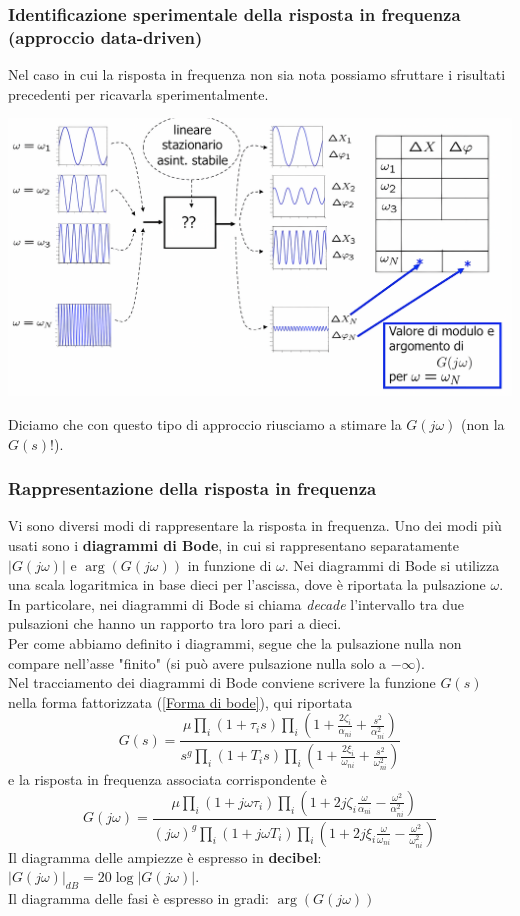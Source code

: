 \documentclass{article}
\numberwithin{equation}{subsection}
\begin{document}
\subsubsection{Identificazione sperimentale della risposta in frequenza (approccio data-driven)}
Nel caso in cui la risposta in frequenza non sia nota possiamo sfruttare i risultati precedenti per ricavarla sperimentalmente.
\begin{center}
    \includegraphics[scale=0.15]{Images/Risposta_in_frequenza_2.png}
\end{center}
Diciamo che con questo tipo di approccio riusciamo a stimare la $G(j\omega)$ (non la $G(s)$!).


\subsubsection{Rappresentazione della risposta in frequenza}
Vi sono diversi modi di rappresentare la risposta in frequenza. Uno dei modi più usati sono i \textbf{diagrammi di Bode}, in cui si rappresentano separatamente $|G(j\omega)|$ e $\arg(G(j\omega))$ in funzione di $\omega$. Nei diagrammi di Bode si utilizza una scala logaritmica in base dieci per l'ascissa, dove è riportata la pulsazione $\omega$. In particolare, nei diagrammi di Bode si chiama \textit{decade} l'intervallo tra due pulsazioni che hanno un rapporto tra loro pari a dieci.\\
Per come abbiamo definito i diagrammi, segue che la pulsazione nulla non compare nell'asse "finito" (si può avere pulsazione nulla solo a $-\infty$).
\vspace*{0.2cm}\\
Nel tracciamento dei diagrammi di Bode conviene scrivere la funzione $G(s)$ nella forma fattorizzata (\ref{Forma di bode}), qui riportata
\[
    G(s) = \frac{\mu \prod_i (1 + \tau_i s)\prod_i (1 + \frac{2\zeta_i}{\alpha_{ni}} + \frac{s^2}{\alpha^2_{ni}})}
    {s^g \prod_i (1 + T_i s)\prod_i (1 + \frac{2\xi_i}{\omega_{ni}} + \frac{s^2}{\omega^2_{ni}})}
\]
e la risposta in frequenza associata corrispondente è
\[
    G(j\omega) = \frac{\mu \prod_i (1 + j\omega\tau_i)\prod_i (1 + 2j\zeta_i\frac{\omega}{\alpha_{ni}} - \frac{\omega^2}{\alpha^2_{ni}})}
    {(j\omega)^g \prod_i (1 + j\omega T_i )\prod_i (1 + 2j\xi_i\frac{\omega}{\omega_{ni}} - \frac{\omega^2}{\omega^2_{ni}})}
\]
Il diagramma delle ampiezze è espresso in \textbf{decibel}: $|G(j\omega)|_{dB} = 20 \log|G(j\omega)|$.\\
Il diagramma delle fasi è espresso in gradi: $\arg(G(j\omega))$
\end{document}
